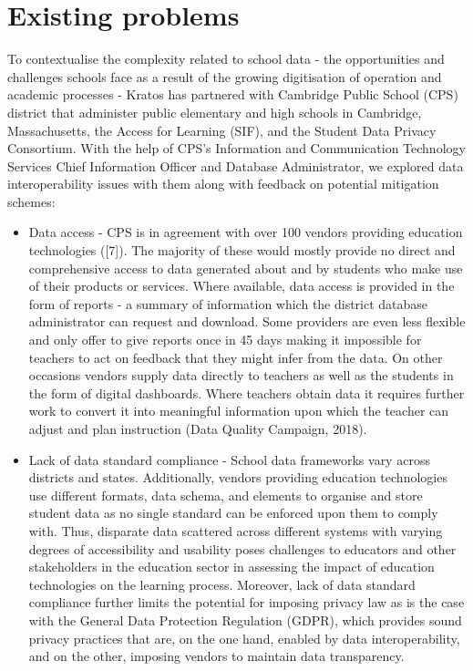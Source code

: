 \documentclass{article}
\begin{document}
\section{Existing problems}
To contextualise the complexity related to school data - the opportunities and challenges schools face as a result of the growing digitisation of operation and academic processes - Kratos has partnered with  Cambridge Public School (CPS) district that administer public elementary and high schools in Cambridge, Massachusetts, the Access for Learning (SIF), and the Student Data Privacy Consortium. With the help of CPS's Information and Communication Technology Services Chief Information Officer and Database Administrator, we explored data interoperability issues with them along with feedback on potential mitigation schemes:

\begin{itemize}
  \item Data access - CPS is in agreement with over 100 vendors providing education technologies ([7]). The majority of these would mostly provide no direct and comprehensive access to data generated about and by students who make use of their products or services. Where available, data access is  provided in the form of reports - a summary of information which the district database administrator can request and download. Some providers are even less flexible and only offer to give reports once in 45 days making it impossible for teachers to act on feedback that they might infer from the data. On other occasions vendors supply data directly to teachers as well as the students in the form of digital dashboards. Where teachers obtain data it requires further work to convert it into meaningful information upon which the teacher can adjust and plan instruction (Data Quality Campaign, 2018).
  
  \item Lack of data standard compliance - School data frameworks vary across districts and states. Additionally, vendors providing education technologies use different formats, data schema, and elements to organise and store student data as no single standard can be enforced upon them to comply with. Thus, disparate data scattered across different systems with varying degrees of accessibility and usability poses challenges to educators and other stakeholders in the education sector in assessing the impact of education technologies on the learning process. Moreover, lack of data standard compliance further limits the potential for imposing privacy law as is the case with the General Data Protection Regulation (GDPR), which provides sound privacy practices that are, on the one hand, enabled by data interoperability, and on the other, imposing vendors to maintain data transparency.
  

\end{itemize}
\end{document}
